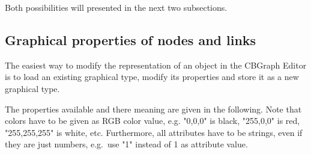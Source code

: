 Both possibilities will presented in the next two
subsections.

\subsection{Graphical properties of nodes and links}
\label{sec:graph-props}

The easiest way to modify the representation of an object
in the CBGraph Editor is to load an existing graphical type,
modify its properties and store it as a new graphical type.

The properties available and there meaning are given in the
following. Note that colors have to be given as RGB color value,
e.g. "0,0,0" is black, "255,0,0" is red, "255,255,255" is white, etc.
Furthermore, all attributes have to be strings, even if they are
just numbers, e.g.\ use "1" instead of 1 as attribute value.

